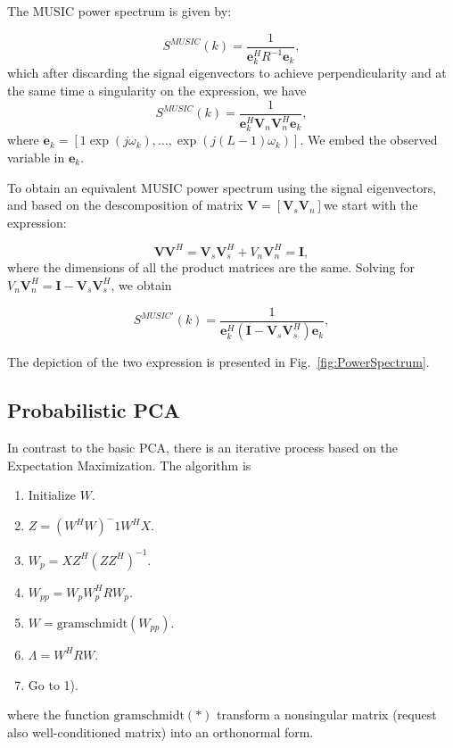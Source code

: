 \documentclass[letterpaper, 10 pt, conference]{ieeeconf}  %
\begin{document}
The MUSIC power spectrum is given by:

\begin{equation*}
    S^{MUSIC}(k) = \frac{1}{\bm{e}_{k}^{H} R^{-1}\bm{e}_{k} },
\end{equation*}
which after discarding the signal eigenvectors to achieve perpendicularity and at the same time a singularity on the expression, we have
\begin{equation*}
    S^{MUSIC}(k) = \frac{1}{\bm{e}_{k}^{H} \bm{V}_{n}  \bm{V}_{n}^{H}\bm{e}_{k} },
\end{equation*}
where $\bm{e}_{k}  = [ 1 \exp{(j\omega_{k})}, \hdots, \exp{(j(L-1)\omega_{k})} ]$. We embed the observed variable in $\bm{e}_{k} $.

To obtain an equivalent MUSIC power spectrum using the signal eigenvectors, and based on the descomposition of matrix $ \bm{V} = [ \bm{V}_{s}  \bm{V}_{n}]$we start with the expression:

\begin{equation*}
    \bm{V}\bm{V}^{H} = \bm{V}_{s}\bm{V}_{s}^{H} + {V}_{n}\bm{V}_{n}^{H} = \bm{I},
\end{equation*}
where the dimensions of all the product matrices are the same. Solving for ${V}_{n}\bm{V}_{n}^{H} =  \bm{I} -  \bm{V}_{s}\bm{V}_{s}^{H}$, we obtain

\begin{equation*}
    S^{MUSIC \prime}(k) = \frac{1}{\bm{e}_{k}^{H}(\bm{I} -  \bm{V}_{s}\bm{V}_{s}^{H})\bm{e}_{k} },
\end{equation*}

The depiction of the two expression is presented in Fig.~\ref{fig:PowerSpectrum}.

\subsection{Probabilistic PCA}
\label{sec:TheoryProbabilisticPCA}

In contrast to the basic PCA, there is an iterative process based on the Expectation Maximization. The algorithm is

\begin{enumerate}
\item Initialize $W$.
\item $Z = (W^{H}W)^-1 W^{H}X$.
\item $W_{p} = XZ^{H}(ZZ^{H})^{-1}$.
\item $W_{pp} = W_{p}W_{p}^{H}RW_{p}$. 
\item $W = \text{gramschmidt}(W_{pp})$.
\item $\Lambda = W^{H}RW$.
\item Go to 1).
\end{enumerate}
where the function $\text{gramschmidt}(\ast)$ transform a nonsingular matrix (request also well-conditioned matrix) into an orthonormal form.
\end{document}

